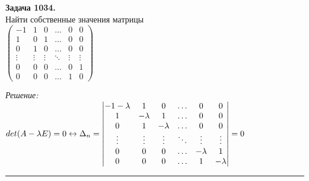 \documentclass[a4paper, 12pt]{article}
\newenvironment{problem}[2][Задача]
{ \begin{mdframed}[backgroundcolor=gray!10] \textbf{#1 #2.} \\}
	{  \end{mdframed}}
\newenvironment{solution}
{\textit{Решение:}\vspace{.1cm}\\}
{\vspace{.1cm}\noindent\rule{7in}{1.5pt}}
\begin{document}
\begin{problem}{1034}
Найти собственные значения матрицы\\
$\left( \begin{array}{rrrrrr}-1 & 1 & 0 & \ldots & 0 & 0 \\ 1 & 0 & 1 & \ldots & 0 & 0 \\ 0 & 1 & 0 & \ldots & 0 & 0 \\ \vdots & \vdots & \vdots & \ddots & \vdots & \vdots \\ 0 & 0 & 0 & \ldots & 0 & 1 \\ 0 & 0 & 0 & \ldots & 1 & 0 \end{array} \right)$

\end{problem}
\begin{solution}
$
det(A-\lambda E) = 0 \leftrightarrow \Delta_n =
\begin{vmatrix}
	-1-\lambda & 1 & 0 & \ldots & 0 & 0 \\ 
	1 & -\lambda & 1 & \ldots & 0 & 0 \\ 
	0 & 1 & -\lambda & \ldots & 0 & 0 \\ 
	\vdots & \vdots & \vdots & \ddots & \vdots & \vdots 
	\\ 0 & 0 & 0 & \ldots & -\lambda & 1 \\ 
	0 & 0 & 0 & \ldots & 1 & -\lambda\\
\end{vmatrix}= 0\\
$


\end{solution}
\end{document}
